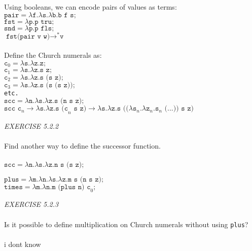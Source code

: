 \documentclass{article}
\begin{document}
Using booleans, we can encode pairs of values as terms:\\
\(\texttt{pair}=\lambda \texttt{f.}\lambda \texttt{s.} \lambda \texttt{b.b f s;}\)\\
\(\texttt{fst}=\lambda \texttt{p.p tru;}\)\\
\(\texttt{snd}=\lambda \texttt{p.p fls;}\)\\
\(\texttt{fst(pair v w)}\to^{*}\texttt{v}\)\\\\
Define the Church numerals as:\\
\(\texttt{c}_{0}=\lambda \texttt{s.}\lambda \texttt{z.z;}\)\\
\(\texttt{c}_{1}=\lambda \texttt{s.}\lambda \texttt{z.s z;}\)\\
\(\texttt{c}_{2}=\lambda \texttt{s.}\lambda \texttt{z.s (s z);}\)\\
\(\texttt{c}_{3}=\lambda \texttt{s.}\lambda \texttt{z.s (s (s z));}\)\\
\texttt{etc.}\\
\(\texttt{scc}=\lambda \texttt{n.}\lambda \texttt{s.}\lambda \texttt{z.s (n s z);}\)\\
\(\texttt{scc c}_{n}\to \lambda \texttt{s.} \lambda \texttt{z.s (c}_{n} \texttt{ s z)}\to \lambda \texttt{s.} \lambda \texttt{z.s ((}\lambda \texttt{s}_{n}\texttt{.}\lambda \texttt{z}_{n}\texttt{.s}_{n}\texttt{ (...)) s z)}\)\\
\begin{siderules}\color{blue}\textit{EXERCISE 5.2.2}\color{black}\\\\
    \color{blue}Find another way to define the successor function.\color{black}\\\\
    \(\texttt{scc}=\lambda\texttt{n.}\lambda \texttt{s.}\lambda \texttt{z.n s (s z);}\)
\end{siderules}
\(\texttt{plus}=\lambda \texttt{m.}\lambda \texttt{n.}\lambda \texttt{s.}\lambda \texttt{z.m s (n s z);}\)\\
\(\texttt{times}=\lambda \texttt{m.}\lambda \texttt{n.m (plus n) c}_{0}\texttt{;}\)
\begin{siderules}\color{blue}\textit{EXERCISE 5.2.3}\color{black}\\\\
\color{blue}Is it possible to define multiplication on Church numerals without using \texttt{plus}?\\\\
\color{red}i dont know\color{black}
\end{siderules}
\end{document}
